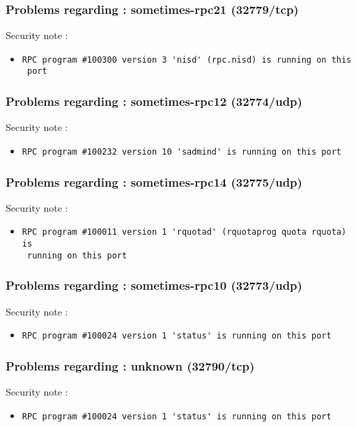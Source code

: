 \documentclass{article}
\begin{document}
\subsubsection{Problems regarding : sometimes-rpc21 (32779/tcp)}
Security note :\\
\begin{itemize}
\item \begin{verbatim}
RPC program #100300 version 3 'nisd' (rpc.nisd) is running on this
 port
\end{verbatim}\end{itemize}
\subsubsection{Problems regarding : sometimes-rpc12 (32774/udp)}
Security note :\\
\begin{itemize}
\item \begin{verbatim}
RPC program #100232 version 10 'sadmind' is running on this port
\end{verbatim}\end{itemize}
\subsubsection{Problems regarding : sometimes-rpc14 (32775/udp)}
Security note :\\
\begin{itemize}
\item \begin{verbatim}
RPC program #100011 version 1 'rquotad' (rquotaprog quota rquota) is
 running on this port
\end{verbatim}\end{itemize}
\subsubsection{Problems regarding : sometimes-rpc10 (32773/udp)}
Security note :\\
\begin{itemize}
\item \begin{verbatim}
RPC program #100024 version 1 'status' is running on this port
\end{verbatim}\end{itemize}
\subsubsection{Problems regarding : unknown (32790/tcp)}
Security note :\\
\begin{itemize}
\item \begin{verbatim}
RPC program #100024 version 1 'status' is running on this port
\end{verbatim}\end{itemize}
\end{document}
